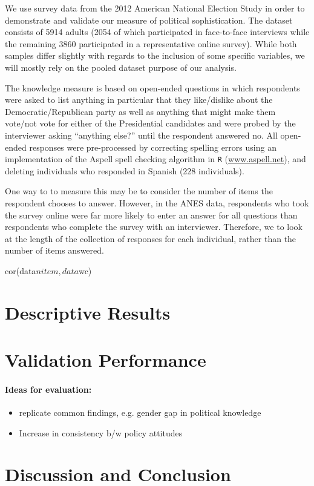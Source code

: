 \documentclass[12pt]{article}
\begin{document}
We use survey data from the 2012 American National Election Study in order to demonstrate and validate  our measure of political sophistication. The dataset consists of 5914 adults (2054 of which participated in face-to-face interviews while the remaining 3860 participated in a representative online survey). While both samples differ slightly with regards to the inclusion of some specific variables, we will mostly rely on the pooled dataset purpose of our analysis.

The knowledge measure is based on open-ended questions in which respondents were asked to list anything in particular that they like/dislike about the Democratic/Republican party as well as anything that might make them vote/not vote for either of the Presidential candidates and were probed by the interviewer asking ``anything else?'' until the respondent answered no. All open-ended responses were pre-processed by correcting spelling errors using an implementation of the Aspell spell checking algorithm in \texttt{R} (\url{www.aspell.net}), and deleting individuals who responded in Spanish (228 individuals).


 One way to to measure this may be 
to consider the number of items the respondent chooses to answer.  
However, in the ANES data, respondents who took the survey online 
were far more likely to enter an answer for all questions than 
respondents who complete the survey with an interviewer.  Therefore, 
we to look at the length of the collection of responses for each 
individual, rather than the number of items answered.  

cor(data$nitem,data$wc)


\section{Descriptive Results}


\section{Validation Performance}


\paragraph{Ideas for evaluation:}
\begin{itemize}\singlespacing
\item replicate common findings, e.g. gender gap in political knowledge \citep[e.g.][]{barabas2014question}
\item Increase in consistency b/w policy attitudes \citep[e.g.][]{prior2014visual}
\end{itemize}

\section{Discussion and Conclusion}


\clearpage\singlespacing\footnotesize


\end{document}
